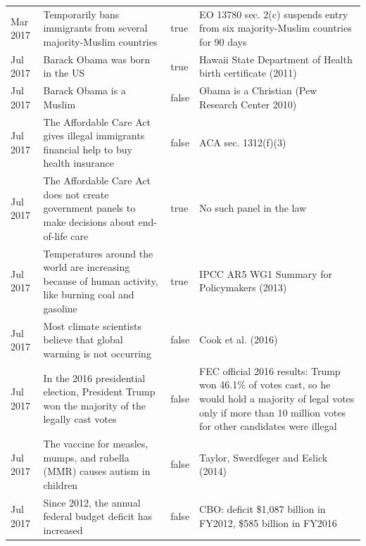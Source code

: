 \begin{longtable}{lp{4.8cm}lp{7cm}}
Mar 2017 & Temporarily bans immigrants from several majority-Muslim countries & true & EO 13780 sec. 2(c) suspends entry from six majority-Muslim countries for 90 days \\
Jul 2017 & Barack Obama was born in the US & true & Hawaii State Department of Health birth certificate (2011) \\
Jul 2017 & Barack Obama is a Muslim & false & Obama is a Christian (Pew Research Center 2010) \\
Jul 2017 & The Affordable Care Act gives illegal immigrants financial help to buy health insurance & false & ACA sec. 1312(f)(3) \\
Jul 2017 & The Affordable Care Act does not create government panels to make decisions about end-of-life care & true & No such panel in the law \\
Jul 2017 & Temperatures around the world are increasing because of human activity, like burning coal and gasoline & true & IPCC AR5 WG1 Summary for Policymakers (2013) \\
Jul 2017 & Most climate scientists believe that global warming is not occurring & false & Cook et al. (2016) \\
Jul 2017 & In the 2016 presidential election, President Trump won the majority of the legally cast votes & false & FEC official 2016 results: Trump won 46.1\% of votes cast, so he would hold a majority of legal votes only if more than 10 million votes for other candidates were illegal \\
Jul 2017 & The vaccine for measles, mumps, and rubella (MMR) causes autism in children & false & Taylor, Swerdfeger and Eslick (2014) \\
Jul 2017 & Since 2012, the annual federal budget deficit has increased & false & CBO: deficit \$1,087 billion in FY2012, \$585 billion in FY2016 \\
\end{longtable}
